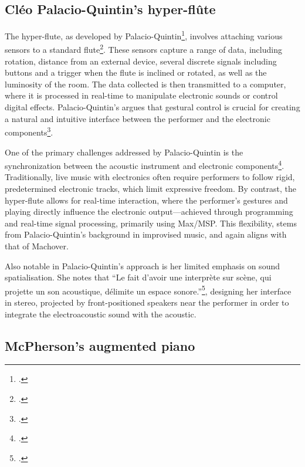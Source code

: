 \documentclass[12pt,twoside,maitrise]{dms_ks}
\theoremstyle{definition}
\begin{document}
{\subsection{Cléo Palacio-Quintin's hyper-flûte}

The hyper-flute, as developed by Palacio-Quintin\footcite{noauthor_souffles_2017}, involves attaching various sensors to a standard flute\footcite[27]{palacio-quintin_composition_2012-1}. 
These sensors capture a range of data, including rotation, distance from an external device, several discrete signals including buttons and a trigger when the flute is inclined or rotated, as well as the luminosity of the room. 
The data collected is then transmitted to a computer, where it is processed in real-time to manipulate electronic sounds or control digital effects. 
Palacio-Quintin's argues that gestural control is crucial for creating a natural and intuitive interface between the performer and the electronic components\footcite[12]{palacio-quintin_composition_2012-1}. 

One of the primary challenges addressed by Palacio-Quintin is the synchronization between the acoustic instrument and electronic components\footcite[10--11]{palacio-quintin_composition_2012-1}. 
Traditionally, live music with electronics often require performers to follow rigid, predetermined electronic tracks, which limit expressive freedom. 
By contrast, the hyper-flute allows for real-time interaction, where the performer's gestures and playing directly influence the electronic output---achieved through programming and real-time signal processing, primarily using Max/MSP.
This flexibility, stems from Palacio-Quintin's background in improvised music, and again aligns with that of Machover.

Also notable in Palacio-Quintin's approach is her limited emphasis on sound spatialisation. 
She notes that “Le fait d’avoir une interprète sur scène, qui projette un son acoustique, délimite un espace sonore.”\footcite[50]{palacio-quintin_composition_2012-1}, designing her interface in stereo, projected by front-positioned speakers near the performer in order to integrate the electroacoustic sound with the acoustic. 

\subsection{McPherson's augmented piano}

}
\end{document}
